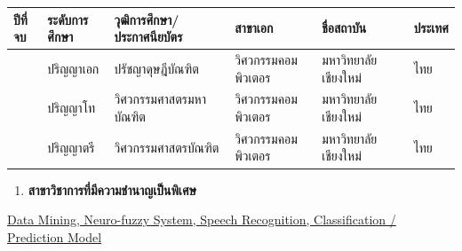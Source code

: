 \documentclass[16pt]{extarticle}
\newcounter{none} %
\begin{document}
{\def\LTcaptype{none} %
\begin{longtable}[]{@{}
  >{\raggedright\arraybackslash}p{}
  >{\raggedright\arraybackslash}p{}
  >{\raggedright\arraybackslash}p{}
  >{\raggedright\arraybackslash}p{}
  >{\raggedright\arraybackslash}p{}
  >{\raggedright\arraybackslash}p{}@{}}
\toprule\noalign{}
\begin{minipage}[b]{\linewidth}\centering
\textbf{ปีที่จบ}
\end{minipage} & \begin{minipage}[b]{\linewidth}\centering
\textbf{ระดับการศึกษา}
\end{minipage} & \begin{minipage}[b]{\linewidth}\centering
\textbf{วุฒิการศึกษา/ประกาศนียบัตร}
\end{minipage} & \begin{minipage}[b]{\linewidth}\centering
\textbf{สาขาเอก}
\end{minipage} & \begin{minipage}[b]{\linewidth}\centering
\textbf{ชื่อสถาบัน}
\end{minipage} & \begin{minipage}[b]{\linewidth}\centering
\textbf{ประเทศ}
\end{minipage} \\
\midrule\noalign{}
\endhead
\bottomrule\noalign{}
\endlastfoot
2564 & ปริญญาเอก & ปรัชญาดุษฎีบัณฑิต & วิศวกรรมคอมพิวเตอร & มหาวิทยาลัยเชียงใหม่ &
ไทย \\
2558 & ปริญญาโท & วิศวกรรมศาสตรมหาบัณฑิต & วิศวกรรมคอมพิวเตอร &
มหาวิทยาลัยเชียงใหม่ & ไทย \\
2557 & ปริญญาตรี & วิศวกรรมศาสตรบัณฑิต & วิศวกรรมคอมพิวเตอร & มหาวิทยาลัยเชียงใหม่
& ไทย \\
\end{longtable}
}

\begin{enumerate}
\def\labelenumi{\arabic{enumi}.}
\setcounter{enumi}{5}
\item
  \textbf{สาขาวิชาการที่มีความชำนาญเป็นพิเศษ}
\end{enumerate}

\noindent\hspace{1em}\uline{Data Mining, Neuro-fuzzy System, Speech Recognition, Classification
/ Prediction Model}
\end{document}
